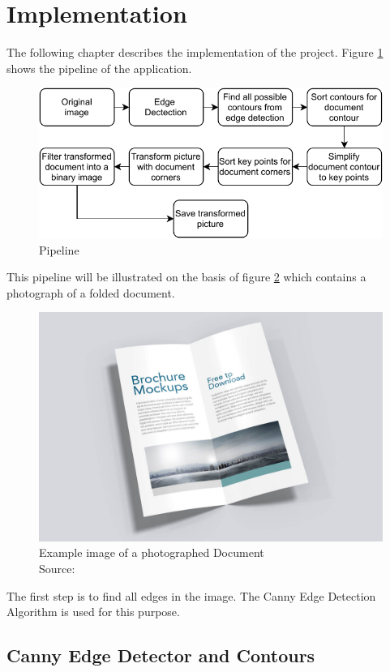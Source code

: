 \section{Implementation}
The following chapter describes the implementation of the project. Figure \ref{fig:pipeline} shows the pipeline of the application.

\begin{figure}[H]
    \centering
    \includegraphics[width=.7\textwidth]{images/pipeline.pdf}
    \caption{Pipeline}
    \label{fig:pipeline}
\end{figure}

This pipeline will be illustrated on the basis of figure \ref{fig:doc_og} which contains a photograph of a folded document.

\begin{figure}[H]
    \centering
    \includegraphics[width=.6\textwidth]{images/3_folded_doc/Brochure-Mockup.jpg}
    \caption{Example image of a photographed Document\\Source: \cite{folded_doc}}
    \label{fig:doc_og}
\end{figure}

The first step is to find all edges in the image. The Canny Edge Detection Algorithm is used for this purpose.

\newpage

\subsection{Canny Edge Detector and Contours}


